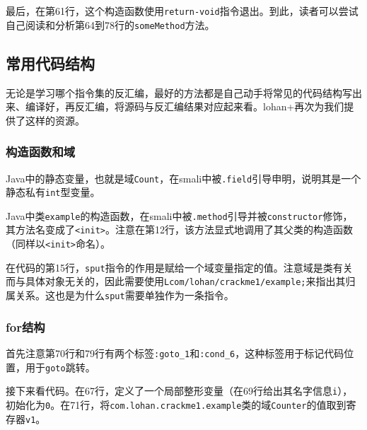 最后，在第61行，这个构造函数使用\lstinline!return-void!指令退出。到此，读者可以尝试自己阅读和分析第64到78行的\lstinline!someMethod!方法。

\subsection{常用代码结构}
无论是学习哪个指令集的反汇编，最好的方法都是自己动手将常见的代码结构写出来、编译好，再反汇编，将源码与反汇编结果对应起来看。lohan+再次为我们提供了这样的资源。

\subsubsection{构造函数和域}



Java中的静态变量，也就是域\lstinline!Count!，在smali中被\lstinline!.field!引导申明，说明其是一个静态私有\lstinline!int!型变量。

Java中类\lstinline!example!的构造函数，在smali中被\lstinline!.method!引导并被\lstinline!constructor!修饰，其方法名变成了\lstinline!<init>!。注意在第12行，该方法显式地调用了其父类的构造函数（同样以\lstinline!<init>!命名）。

在代码的第15行，\lstinline!sput!指令的作用是赋给一个域变量指定的值。注意域是类有关而与具体对象无关的，因此需要使用\lstinline!Lcom/lohan/crackme1/example;!来指出其归属关系。这也是为什么\lstinline!sput!需要单独作为一条指令。

\subsubsection{for结构}
\label{SubSubSec:dalvik-smali-for}




首先注意第70行和79行有两个标签\lstinline!:goto_1!和\lstinline!:cond_6!，这种标签用于标记代码位置，用于\lstinline!goto!跳转。

接下来看代码。在67行，定义了一个局部整形变量（在69行给出其名字信息\lstinline!i!），初始化为\lstinline!0!。在71行，将\lstinline!com.lohan.crackme1.example!类的域\lstinline!Counter!的值取到寄存器\lstinline!v1!。

